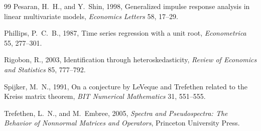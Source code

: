 \documentclass[12pt]{article}
\theoremstyle{definition}
\theoremstyle{remark}
\begin{document}
\begin{thebibliography}{99}
Pesaran, H.~H., and Y.~Shin, 1998, Generalized impulse response analysis in linear multivariate models, \emph{Economics Letters} 58, 17--29.

Phillips, P.~C.~B., 1987, Time series regression with a unit root, \emph{Econometrica} 55, 277--301.

Rigobon, R., 2003, Identification through heteroskedasticity, \emph{Review of Economics and Statistics} 85, 777--792.

Spijker, M.~N., 1991, On a conjecture by LeVeque and Trefethen related to the Kreiss matrix theorem, \emph{BIT Numerical Mathematics} 31, 551--555.

Trefethen, L.~N., and M.~Embree, 2005, \emph{Spectra and Pseudospectra: The Behavior of Nonnormal Matrices and Operators}, Princeton University Press.

\end{thebibliography}
\end{document}
